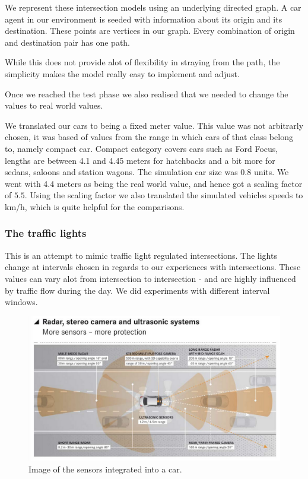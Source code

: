 
We represent these intersection models using an underlying directed graph.
 A car agent in our environment is seeded with information about its origin and its destination.
These points are vertices in our graph. 
Every combination of origin and destination pair has one path.

While this does not provide alot of flexibility in straying from the path, the simplicity makes the model really easy to implement and adjust.

Once we reached the test phase we also realised that we needed to change the values to real world values.

We translated our cars to being a fixed meter value. This value was not arbitrarly chosen, it was based of values from the range in which cars of that class belong to, namely compact car.
Compact category covers cars such as Ford Focus, lengths are between 4.1 and 4.45 meters for hatchbacks and a bit more for sedans, saloons and station wagons.
The simulation car size was 0.8 units. We went with 4.4 meters as being the real world value, and hence got a scaling factor of $5.5$.
Using the scaling factor we also translated the simulated vehicles speeds to km/h, which is quite helpful for the comparisons.

\subsubsection{The traffic lights}
This is an attempt to mimic traffic light regulated intersections.
The lights change at intervals chosen in regards to our experiences with intersections. 
These values can vary alot from intersection to intersection - and are highly influenced by traffic flow during the day. 
We did experiments with different interval windows.

\begin{figure}
\centering
\includegraphics[scale=.2]{img/tesla_sensor}
\caption{Image of the sensors integrated into a car.}
\label{figure:tesla_sens}
\end{figure}

